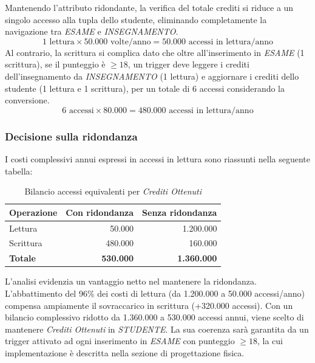 Mantenendo l'attributo ridondante, 
la verifica del totale crediti si riduce a 
un singolo accesso alla tupla dello studente, eliminando 
completamente la navigazione tra \textit{ESAME} e 
\textit{INSEGNAMENTO}.
$$1 \text{ lettura} \times 50.000 \text{ volte/anno} = 50.000 \text{ accessi in lettura/anno}$$
Al contrario, la scrittura si complica dato che oltre all'inserimento in \textit{ESAME} 
(1 scrittura), se il punteggio è $\geq 18$, un trigger deve leggere 
i crediti dell'insegnamento da \textit{INSEGNAMENTO} (1 lettura) e 
aggiornare i crediti dello studente (1 lettura e 1 scrittura), 
per un totale di 6 accessi considerando la conversione.
$$6 \text{ accessi} \times 80.000 = 480.000 \text{ accessi in lettura/anno}$$

\subsubsection{Decisione sulla ridondanza}

I costi complessivi annui espressi in accessi in lettura sono riassunti nella seguente tabella:

\begin{table}[h]
    \centering
    \renewcommand{\arraystretch}{1.2}
    \begin{tabular}{|l|r|r|}
        \hline
        \textbf{Operazione} & \textbf{Con ridondanza} 
        & \textbf{Senza ridondanza} \\
        \hline
        Lettura & 50.000 & 1.200.000 \\
        \hline
        Scrittura & 480.000 & 160.000 \\
        \hline
        \textbf{Totale} & \textbf{530.000} & \textbf{1.360.000} \\
        \hline
    \end{tabular}
    \caption{Bilancio accessi equivalenti per \textit{Crediti Ottenuti}}
\end{table}

\noindent
L'analisi evidenzia un vantaggio netto nel mantenere la ridondanza. 
L'abbattimento del 96\% dei costi di lettura (da 1.200.000 a 50.000 accessi/anno) 
compensa ampiamente il sovraccarico in scrittura (+320.000 accessi). 
Con un bilancio complessivo ridotto da 1.360.000 a 530.000 accessi annui,
viene scelto di mantenere \textit{Crediti Ottenuti} in \textit{STUDENTE}. 
La sua coerenza sarà garantita da un trigger 
attivato ad ogni inserimento in \textit{ESAME} con punteggio 
$\geq 18$, la cui implementazione è descritta nella sezione di 
progettazione fisica.
